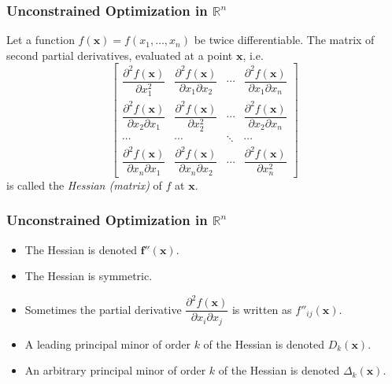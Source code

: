 \documentclass[10pt]{beamer}
\theoremstyle{definition}
\begin{document}
\begin{frame}[fragile]
\frametitle{Unconstrained Optimization in $ \mathbb{R}^n $}
Let a function $ f(\mathbf{x})=f(x_1,\ldots,x_n) $ be twice differentiable. The matrix of second partial derivatives, evaluated at a point $ \mathbf{x} $, i.e. \[ \begin{bmatrix}
\dfrac{\partial^2 f(\mathbf{x})}{\partial x_1^2 } & \dfrac{\partial^2 f(\mathbf{x})}{\partial x_1 \partial x_2} & \cdots & \dfrac{\partial^2 f(\mathbf{x})}{\partial x_1 \partial x_n}\\[3ex]
\dfrac{\partial^2 f(\mathbf{x})}{\partial x_2\partial x_1 } & \dfrac{\partial^2 f(\mathbf{x})}{\partial x_2^2} & \cdots & \dfrac{\partial^2 f(\mathbf{x})}{\partial x_2 \partial x_n}\\[3ex]
\cdots & \cdots & \ddots & \cdots \\[3ex]
\dfrac{\partial^2 f(\mathbf{x})}{\partial x_n \partial x_1 } & \dfrac{\partial^2 f(\mathbf{x})}{\partial x_n \partial x_2 } & \cdots & \dfrac{\partial^2 f(\mathbf{x})}{\partial x_n^2}
\end{bmatrix} \] is called the \emph{Hessian (matrix)} of $ f $ at $ \mathbf{x} $.
\end{frame}

\begin{frame}[fragile]
\frametitle{Unconstrained Optimization in $ \mathbb{R}^n $}
\begin{itemize}
\item The Hessian is denoted $ \mathbf{f''(x)} $. \bigskip
\item The Hessian is symmetric. \bigskip
\item Sometimes the partial derivative $ \dfrac{\partial^2 f(\mathbf{x})}{\partial x_i \partial x_j} $ is written as $ f''_{ij}(\mathbf{x}) $. \bigskip
\item A leading principal minor of order $ k $ of the Hessian is denoted $ D_k(\mathbf{x}) $. \bigskip
\item An arbitrary principal minor of order $ k $ of the Hessian is denoted $ \Delta_k(\mathbf{x}) $.
\end{itemize}

\end{frame}
\end{document}
